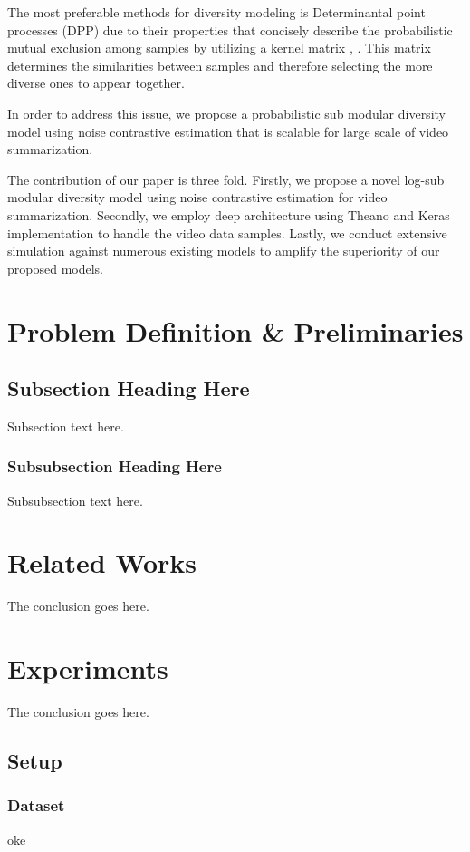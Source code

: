 \documentclass[conference]{IEEEtran}
\begin{document}
The most preferable methods for diversity modeling is Determinantal point processes (DPP) due to their properties that concisely describe the probabilistic mutual exclusion among samples by utilizing a kernel matrix \cite{kulesza2012}, \cite{vsumm}. This matrix determines the similarities between samples and therefore selecting the more diverse ones to appear together.

In order to address this issue, we propose a probabilistic sub modular diversity model using noise contrastive estimation that is scalable for large scale of video summarization.  

The contribution of our paper is three fold. Firstly, we propose a novel log-sub modular diversity model using noise contrastive estimation for video summarization. Secondly, we employ deep architecture using Theano and Keras implementation to handle the video data samples. Lastly, we conduct extensive simulation against numerous existing models to amplify the superiority of our proposed models. 

\section{Problem Definition \& Preliminaries}

\subsection{Subsection Heading Here}
Subsection text here.


\subsubsection{Subsubsection Heading Here}
Subsubsection text here.


\section{Related Works}
The conclusion goes here.

\section{Experiments}
The conclusion goes here.

\subsection{Setup}

\subsubsection{Dataset}
oke
\end{document}
